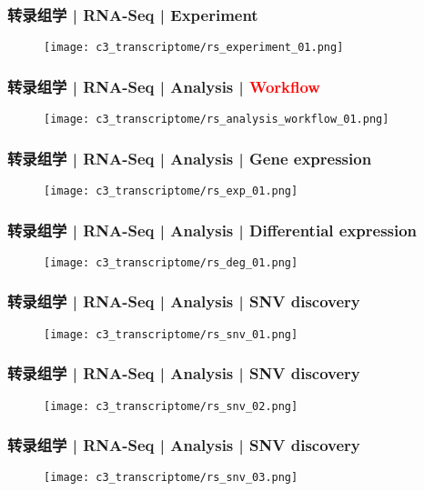 \begin{frame}
  \frametitle{转录组学 | RNA-Seq | Experiment}
  \begin{figure}
    \centering
    \texttt{[image: c3\_transcriptome/rs\_experiment\_01.png]}
  \end{figure}
\end{frame}

\begin{frame}
  \frametitle{转录组学 | RNA-Seq | Analysis | \textcolor{red}{Workflow}}
  \begin{figure}
    \centering
    \texttt{[image: c3\_transcriptome/rs\_analysis\_workflow\_01.png]}
  \end{figure}
\end{frame}

\begin{frame}
  \frametitle{转录组学 | RNA-Seq | Analysis | Gene expression}
  \begin{figure}
    \centering
    \texttt{[image: c3\_transcriptome/rs\_exp\_01.png]}
  \end{figure}
\end{frame}

\begin{frame}
  \frametitle{转录组学 | RNA-Seq | Analysis | Differential expression}
  \begin{figure}
    \centering
    \texttt{[image: c3\_transcriptome/rs\_deg\_01.png]}
  \end{figure}
\end{frame}

\begin{frame}
  \frametitle{转录组学 | RNA-Seq | Analysis | SNV discovery}
  \begin{figure}
    \centering
    \texttt{[image: c3\_transcriptome/rs\_snv\_01.png]}
  \end{figure}
\end{frame}

\begin{frame}
  \frametitle{转录组学 | RNA-Seq | Analysis | SNV discovery}
  \begin{figure}
    \centering
    \texttt{[image: c3\_transcriptome/rs\_snv\_02.png]}
  \end{figure}
\end{frame}

\begin{frame}
  \frametitle{转录组学 | RNA-Seq | Analysis | SNV discovery}
  \begin{figure}
    \centering
    \texttt{[image: c3\_transcriptome/rs\_snv\_03.png]}
  \end{figure}
\end{frame}

